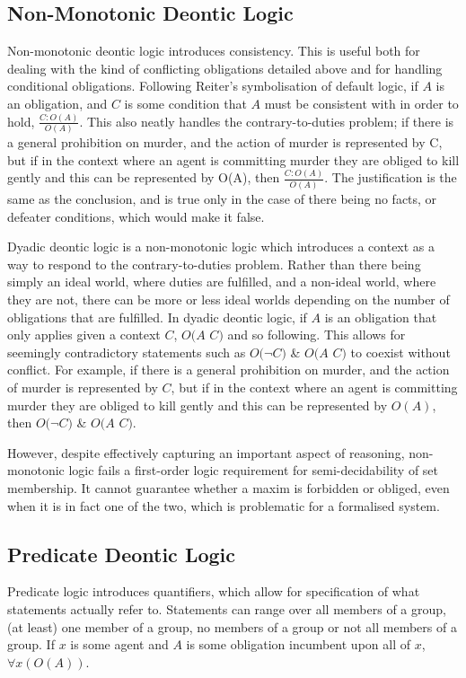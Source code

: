 \documentclass{l4proj}
\begin{document}
\subsection{Non-Monotonic Deontic Logic}
Non-monotonic deontic logic introduces consistency\cite{Powers}. This is useful both for dealing with the kind of conflicting obligations detailed above and for handling conditional obligations\cite{Horty}. Following Reiter's symbolisation of default logic\cite{Reiter}, if $A$ is an obligation, and $C$ is some condition that $A$ must be consistent with in order to hold, \( \frac{C : O(A)}{O(A)} \). This also neatly handles the contrary-to-duties problem; if there is a general prohibition on murder, and the action of murder is represented by C, but if in the context where an agent is committing murder they are obliged to kill gently and this can be represented by O(A), then \( \frac{C : O(A)}{O(A)} \). The justification is the same as the conclusion, and is true only in the case of there being no facts, or defeater conditions, which would make it false. 

Dyadic deontic logic is a non-monotonic logic which introduces a context as a way to respond to the contrary-to-duties problem. Rather than there being simply an ideal world, where duties are fulfilled, and a non-ideal world, where they are not, there can be more or less ideal worlds depending on the number of obligations that are fulfilled. In dyadic deontic logic, if $A$ is an obligation that only applies given a context $C$, $O(A$ \textbar $C)$ and so following. This allows for seemingly contradictory statements such as $O($\( \neg \)$C)$ \& $O(A$ \textbar $C)$ to coexist without conflict. For example, if there is a general prohibition on murder, and the action of murder is represented by $C$, but if in the context where an agent is committing murder they are obliged to kill gently and this can be represented by $O(A)$, then $O($\( \neg \)$C)$ \& $O(A$ \textbar $C)$. 

However, despite effectively capturing an important aspect of reasoning, non-monotonic logic fails a first-order logic requirement for semi-decidability of set membership. It cannot guarantee whether a maxim is forbidden or obliged, even when it is in fact one of the two, which is problematic for a formalised system. 

\subsection{Predicate Deontic Logic}
Predicate logic introduces quantifiers, which allow for specification of what statements actually refer to. Statements can range over all members of a group, (at least) one member of a group, no members of a group or not all members of a group. If $x$ is some agent and $A$ is some obligation incumbent upon all of $x$, \( \forall{x(O(A))} \). 
\end{document}
